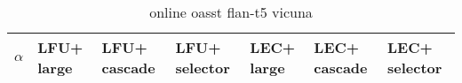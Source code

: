 \begin{table}[ht]
\begin{center}
\begin{tabular}{ cp{3.2em}p{3.2em}p{3.2em}p{3.2em}p{3.2em}p{3.2em} }
  \toprule
  $\alpha$ &  LFU+ large & LFU+ cascade & LFU+ selector & LEC+ large & LEC+ cascade & LEC+ selector \\ 
  \bottomrule
\end{tabular}
\end{center}
\caption{online oasst flan-t5 vicuna}
\label{tab:online_oasst_flan-t5_vicuna}
\end{table}

